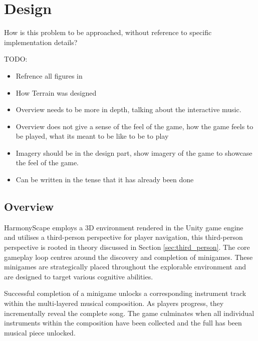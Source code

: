 \documentclass{l4proj}
\begin{document}
\chapter{Design}
How is this problem to be approached, without reference to specific implementation details? 

TODO:
\begin{itemize}
    \item Refrence all figures in
    \item How Terrain was designed
    \item Overview needs to be more in depth, talking about the interactive music.
    \item Overview does not give a sense of the feel of the game, how the game feels to be played, what its meant to be like to be to play
    \item Imagery should be in the design part, show imagery of the game to showcase the feel of the game.
    \item Can be written in the tense that it has already been done
\end{itemize}



\section{Overview}
HarmonyScape employs a 3D environment rendered in the Unity game engine and utilises a third-person perspective for player navigation, this third-person perspective is rooted in theory discussed in Section \ref{sec:third_person}.  The core gameplay loop centres around the discovery and completion of minigames. These minigames are strategically placed throughout the explorable environment and are designed to target various cognitive abilities.

Successful completion of a minigame unlocks a corresponding instrument track within the multi-layered musical composition. As players progress, they incrementally reveal the complete song. The game culminates when all individual instruments within the composition have been collected and the full has been musical piece unlocked.
\end{document}
